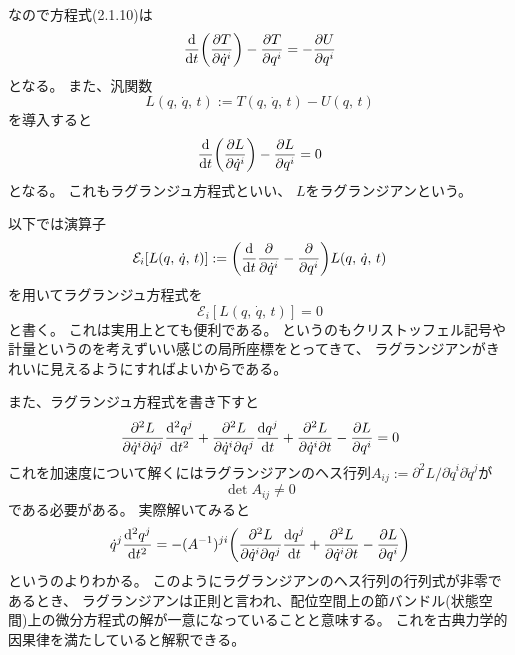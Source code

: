 \documentclass[../../master.tex]{subfiles}
\begin{document}
なので方程式(2.1.10)は
\begin{equation}
    \dv{t}\qty(\pdv{T}{\dot{q}^i})-\pdv{T}{q^i} = -\pdv{U}{q^i}
\end{equation}
となる。
また、汎関数
\begin{equation}
    L(q,\,\dot{q},\,t) := T(q,\,\dot{q},\,t) - U(q,\,t)
\end{equation}
を導入すると
\begin{equation}
    \dv{t}\qty(\pdv{L}{\dot{q}^i})-\pdv{L}{q^i} = 0
\end{equation}
となる。
これもラグランジュ方程式といい、
\(L\)をラグランジアンという。

以下では演算子
\begin{equation}
    \mathcal{E}_i[L(q,\,\dot{q},\,t)] := \qty(\dv{t}\pdv{\dot{q}^i}-\pdv{q^i} )L(q,\,\dot{q},\,t)
\end{equation}
を用いてラグランジュ方程式を
\begin{equation}
    \mathcal{E}_i[L(q,\,\dot{q},\,t)] =0
\end{equation}
と書く。
これは実用上とても便利である。
というのもクリストッフェル記号や計量というのを考えずいい感じの局所座標をとってきて、
ラグランジアンがきれいに見えるようにすればよいからである。

また、ラグランジュ方程式を書き下すと
\begin{equation}
    \pdv[2]{L}{\dot{q}^i}{\dot{q}^j}\dv[2]{q^j}{t} + \pdv[2]{L}{\dot{q}^i}{q^j}\dv{q^j}{t} + \pdv[2]{L}{\dot{q}^i}{t} - \pdv{L}{q^i}=0
\end{equation}
これを加速度について解くにはラグランジアンのヘス行列\(A_{ij} := \partial^2 L/\partial \dot{q}^i \partial \dot{q}^j \)が
\begin{equation}
    \det A_{ij} \neq 0
\end{equation}
である必要がある。
実際解いてみると
\begin{equation}
    {\dot{q}^j}\dv[2]{q^j}{t} = -(A^{-1})^{ji}\qty(\pdv[2]{L}{\dot{q}^i}{q^j}\dv{q^j}{t} + \pdv[2]{L}{\dot{q}^i}{t} - \pdv{L}{q^i})
\end{equation}
というのよりわかる。
このようにラグランジアンのヘス行列の行列式が非零であるとき、
ラグランジアンは正則と言われ、配位空間上の節バンドル(状態空間)上の微分方程式の解が一意になっていることと意味する。
これを古典力学的因果律を満たしていると解釈できる。
\end{document}
